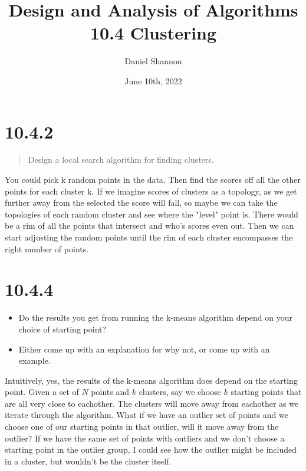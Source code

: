 \documentclass[12pt, letterpaper, twoside]{article}
\title{%
Design and Analysis of Algorithms\\
\large 10.4 Clustering
}
\author{Daniel Shannon}
\date{June 10th, 2022}
\begin{document}
\begin{titlepage}
\maketitle
\end{titlepage}
\section*{10.4.2}
\begin{quote}
    Design a local search algorithm for finding clusters.
\end{quote}
You could pick k random points in the data. Then find the scores off all the other points for each cluster k. If we imagine scores of clusters as a topology, as we get further away from the selected the score will fall, so maybe we can take the topologies of each random cluster and see where the "level" point is. There would be a rim of all the points that intersect and who's scores even out. Then we can start adjusting the random points until the rim of each cluster encompasses the right number of points.

\section*{10.4.4}
    \begin{itemize}
        \item Do the results you get from running the k-means algorithm depend on your choice of starting point?
        \item Either come up with an explanation for why not, or come up with an example.
    \end{itemize}

Intuitively, yes, the results of the k-means algorithm does depend on the starting point.
Given a set of $N$ points and $k$ clusters, say we choose $k$ starting points that are all very close to eachother.
The clusters will move away from eachother as we iterate through the algorithm.
What if we have an outlier set of points and we choose one of our starting points in that outlier, will it move away from the outlier?
If we have the same set of points with outliers and we don't choose a starting point in the outlier group, I could see how the outlier might 
be included in a cluster, but wouldn't be the cluster itself.
\end{document}
